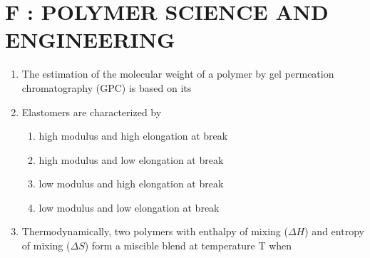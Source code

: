 \documentclass[a4paper,10pt]{article}
\begin{document}
\section*{F : POLYMER SCIENCE AND ENGINEERING}
\begin{enumerate}[label=\Alph*)]
    \item The estimation of the molecular weight of a polymer by gel permeation chromatography (GPC) is based on its
    
    \hfill{}
    \begin{enumerate}
    \end{enumerate}

    \item Elastomers are characterized by
    
    \hfill{}
    \begin{enumerate}[label=\Alph*)]
        \item high modulus and high elongation at break
        \item high modulus and low elongation at break
        \item low modulus and high elongation at break
        \item low modulus and low elongation at break
    \end{enumerate}

    \item Thermodynamically, two polymers with enthalpy of mixing ($\Delta H$) and entropy of mixing ($\Delta S$) form a miscible blend at temperature T when
    
    \hfill{}
    \begin{enumerate}[label=\Alph*)]
    \end{enumerate}


\end{enumerate}
\end{document}
